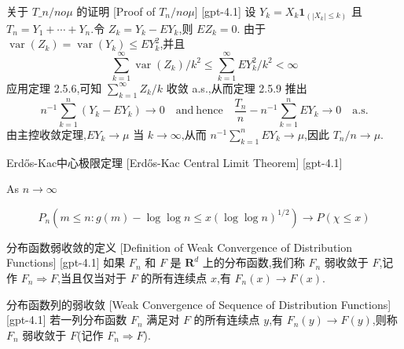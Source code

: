 \documentclass[UTF8]{ctexart}
\begin{document}
    
    
    \begin{prf}
        [Proof-of-$T-n/n-	o-\mu$]
        {关于 $T\_n/n 	o \mu$ 的证明}
        [Proof of $T_n/n 	o \mu$]
        [gpt-4.1]
        设 $Y_{k} = X_{k} \boldsymbol{1}_{(|X_{k}| \leq k)}$ 且 $T_{n} = Y_{1} + \cdots + Y_{n}$.令 $Z_{k} = Y_{k} - E Y_{k}$,则 $E Z_{k} = 0$.
由于 $\operatorname{var}(Z_{k}) = \operatorname{var}(Y_{k}) \leq E Y_{k}^{2}$,并且
\[
\sum_{k=1}^{\infty} \operatorname{var}(Z_{k}) / k^{2} \leq \sum_{k=1}^{\infty} E Y_{k}^{2} / k^{2} < \infty
\]
应用定理 2.5.6,可知 $\sum_{k=1}^{\infty} Z_{k} / k$ 收敛 a.s.,从而定理 2.5.9 推出
\[
n^{-1} \sum_{k=1}^{n} (Y_{k} - E Y_{k}) \to 0 \quad \mathrm{and~hence} \quad \frac{T_{n}}{n} - n^{-1} \sum_{k=1}^{n} E Y_{k} \to 0 \quad \mathrm{a.s.}
\]
由主控收敛定理,$E Y_{k} \to \mu$ 当 $k \to \infty$,从而 $n^{-1} \sum_{k=1}^{n} E Y_{k} \to \mu$,因此 $T_{n} / n \to \mu$.

    \end{prf}
    
    
    
    \begin{thm}
        {Erdős-Kac中心极限定理}
        [Erdős-Kac Central Limit Theorem]
        [gpt-4.1]
        
As $n \to \infty$

\[
P_n(m \leq n : g(m) - \log \log n \leq x (\log \log n)^{1/2}) \to P(\chi \leq x)
\]

    \end{thm}
    
    
    
    \begin{dfn}
        {分布函数弱收敛的定义}
        [Definition of Weak Convergence of Distribution Functions]
        [gpt-4.1]
        如果 $F_n$ 和 $F$ 是 $\mathbf{R}^d$ 上的分布函数,我们称 $F_n$ 弱收敛于 $F$,记作 $F_n \Rightarrow F$,当且仅当对于 $F$ 的所有连续点 $x$,有 $F_n(x) \to F(x)$.
    \end{dfn}
    
    
    
    \begin{dfn}
        {分布函数列的弱收敛}
        [Weak Convergence of Sequence of Distribution Functions]
        [gpt-4.1]
        若一列分布函数 $F_n$ 满足对 $F$ 的所有连续点 $y$,有 $F_n(y) \to F(y)$,则称 $F_n$ 弱收敛于 $F$(记作 $F_n \Rightarrow F$).
    \end{dfn}
    
\end{document}
